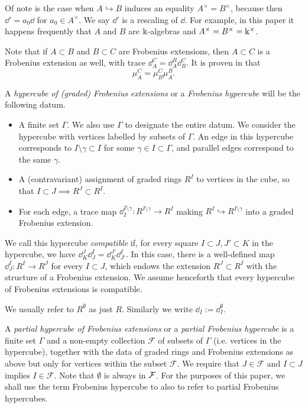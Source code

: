 Of note is the case when $A \hookrightarrow B$ induces an equality $A^\times = B^\times$, because then $\dd' = a_0 \dd$ for $a_0 \in A^\times$. We say $\dd'$ is a rescaling of $\dd$. For example, in this paper it happens frequently that $A$ and $B$ are $\Bbbk$-algebras and $A^\times=B^\times=\Bbbk^\times$.

Note that if $A \subset B$ and $B \subset C$ are Frobenius
extensions, then $A \subset C$ is a Frobenius extension as well, with trace $\dd^C_A = \dd^B_A \dd^C_B$. It is proven in \cite[(2.5)]{EWSFrob} that \begin{equation} \label{eq:mumult} \mu^C_A = \mu^C_B \mu^B_A. \end{equation}


\begin{defn} A \emph{hypercube of (graded) Frobenius extensions} or a \emph{Frobenius hypercube} will be the following datum. \begin{itemize} \item
A finite set $\Gamma$. We also use $\Gamma$ to designate the entire datum. We consider the hypercube with vertices labelled by subsets of
$\Gamma$. An edge in this hypercube corresponds to $I \setminus \gamma \subset I$ for some $\gamma \in I \subset \Gamma$, and parallel
edges correspond to the same $\gamma$. \item A (contravariant) assignment of graded rings $R^I$ to vertices in the cube, so that $I \subset J
\implies R^J \subset R^I$. \item For each edge, a trace map $\dd^{I \setminus \gamma}_I : R^{I \setminus \gamma} \to R^I$ making $R^I \hookrightarrow R^{I
\setminus \gamma}$ into a graded Frobenius extension. 

\end{itemize}
We call this hypercube \emph{compatible} if, for every square $I \subset
J,J' \subset K$ in the hypercube, we have $\dd^J_K \dd^I_J = \dd^{J'}_K \dd^I_{J'}$. In this case,
there is a well-defined map $\dd^I_J : R^I \to R^J$ for every $I \subset J$, which endows the extension $R^J \subset R^I$ with the
structure of a Frobenius extension. We assume henceforth that every hypercube of Frobenius extensions is compatible.

We usually refer to $R^{\emptyset}$ as just $R$. Similarly we write $\dd_I := \dd^\emptyset_I$.


A \emph{partial hypercube of Frobenius extensions} or a \emph{partial Frobenius hypercube} is a finite set $\Gamma$ and a non-empty collection $\mathcal{F}$ of subsets of $\Gamma$ (i.e. vertices in the hypercube), together with the data of graded rings and Frobenius extensions as above but only for vertices within the subset $\mathcal{F}$. We require that $J \in \mathcal{F}$ and $I \subset J$ implies $I \in \mathcal{F}$.  Note that $\emptyset$ is always in $\mathcal{F}$. For the purposes of this paper, we shall use the term Frobenius hypercube to also to refer to partial Frobenius hypercubes.
\end{defn}

